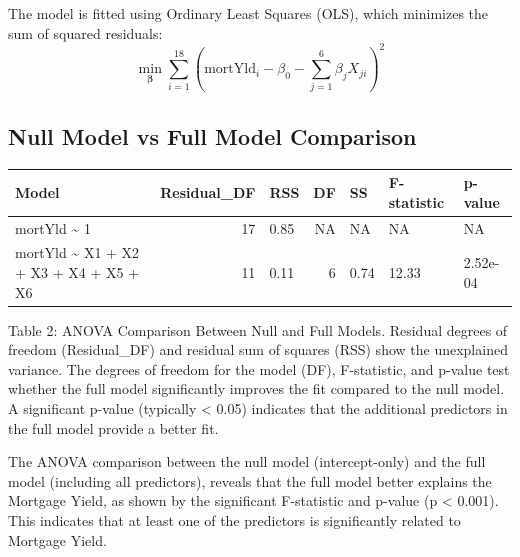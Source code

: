 \documentclass[
  12pt,
]{article}
\begin{document}
\vspace{0.2cm}

The model is fitted using Ordinary Least Squares (OLS), which minimizes
the sum of squared residuals:\\
\vspace{-0.2cm} \[
\min_{\boldsymbol\beta} \sum_{i=1}^{18} \left( \text{mortYld}_i - \beta_0 - \sum_{j=1}^{6} \beta_j X_{ji} \right)^2
\] \vspace{-0.3cm}

\subsection{Null Model vs Full Model
Comparison}\label{null-model-vs-full-model-comparison}

\begin{table}[!h]
\centering\begingroup\fontsize{8}{10}\selectfont

\begin{tabular}{lrlrlll}
\toprule
Model & Residual\_DF & RSS & DF & SS & F-statistic & p-value\\
\midrule
mortYld \textasciitilde{} 1 & 17 & 0.85 & NA & NA & NA & NA\\
mortYld \textasciitilde{} X1 + X2 + X3 + X4 + X5 + X6 & 11 & 0.11 & 6 & 0.74 & 12.33 & 2.52e-04\\
\bottomrule
\end{tabular}
\endgroup{}
\end{table}
\vspace{-0.2em}

\noindent \fontsize{12}{14}\selectfont Table 2: ANOVA Comparison Between
Null and Full Models. Residual degrees of freedom (Residual\_DF) and
residual sum of squares (RSS) show the unexplained variance. The degrees
of freedom for the model (DF), F-statistic, and p-value test whether the
full model significantly improves the fit compared to the null model. A
significant p-value (typically \textless{} 0.05) indicates that the
additional predictors in the full model provide a better fit.

\par

\vspace{1cm}

The ANOVA comparison between the null model (intercept-only) and the
full model (including all predictors), reveals that the full model
better explains the Mortgage Yield, as shown by the significant
F-statistic and p-value (p \textless{} 0.001). This indicates that at
least one of the predictors is significantly related to Mortgage Yield.
\end{document}
